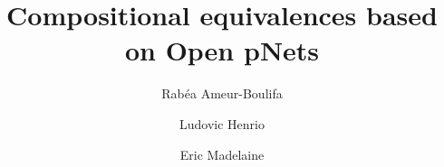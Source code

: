 \documentclass{elsarticle}
\begin{document}
\title{Compositional equivalences based on Open pNets
}
\author{Rab\'ea Ameur-Boulifa}
\address{LTCI, T\'el\'ecom Paris, Institut Polytechnique de Paris, France
}         

\author{Ludovic Henrio}
\address{Univ Lyon, EnsL, UCBL, CNRS, Inria,  LIP, F-69342, LYON Cedex 07, France.}

\author{Eric Madelaine}
\address{INRIA Sophia Antipolis M\'edit\'erann\'ee, UCA, BP 93, 06902 Sophia Antipolis, France}

\end{document}
